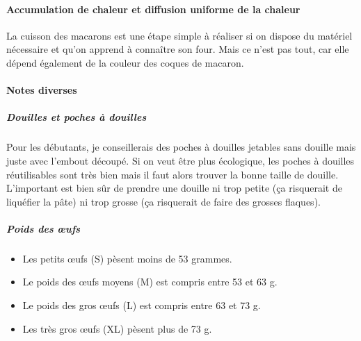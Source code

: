 \documentclass[a4paper]{article}
\begin{document}
\paragraph{Accumulation de chaleur et diffusion uniforme de la chaleur}
La cuisson des macarons est une  étape simple à réaliser si on dispose
du matériel nécessaire et qu'on  apprend à connaître son four. Mais ce
n'est pas tout, car elle dépend  également de la couleur des coques de
macaron.

\paragraph{Notes diverses}

\subparagraph{Douilles et poches à douilles} Pour les débutants, je
conseillerais des poches à douilles jetables sans douille mais juste
avec l'embout découpé.  Si on veut être plus écologique, les poches à
douilles réutilisables sont très bien mais il faut alors trouver la
bonne taille de douille.  L'important est bien sûr de prendre une
douille ni trop petite (ça risquerait de liquéfier la pâte) ni trop
grosse (ça risquerait de faire des grosses flaques).

\subparagraph{Poids des œufs}
\begin{itemize}
\item Les petits œufs (S) pèsent moins de 53 grammes.
\item Le poids des œufs moyens (M) est compris entre 53 et 63 g.
\item Le poids des gros œufs (L) est compris entre 63 et 73 g.
\item Les très gros œufs (XL) pèsent plus de 73 g.
\end{itemize}



\end{document}

